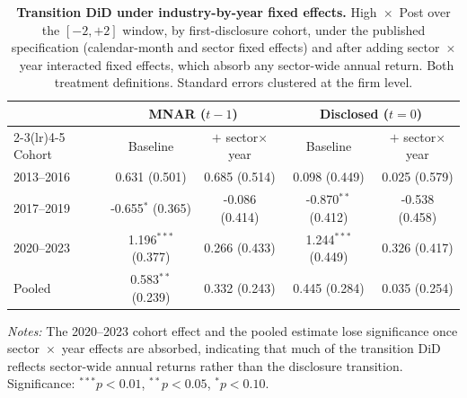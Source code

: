 \documentclass[a4paper,12pt]{article}
\begin{document}
\begin{table}[htbp]
\footnotesize\centering
\caption{\textbf{Transition DiD under industry-by-year fixed effects.}
High~$\times$~Post over the $[-2,+2]$ window, by first-disclosure cohort, under
the published specification (calendar-month and sector fixed effects) and after
adding sector~$\times$~year interacted fixed effects, which absorb any
sector-wide annual return. Both treatment definitions. Standard errors clustered
at the firm level.}
\label{tab:returns_did_industry_year}
\begin{tabular}{lcccc}
\toprule
 & \multicolumn{2}{c}{MNAR ($t-1$)} & \multicolumn{2}{c}{Disclosed ($t=0$)} \\
\cmidrule(lr){2-3}\cmidrule(lr){4-5}
Cohort & Baseline & $+$ sector$\times$year & Baseline & $+$ sector$\times$year \\
\midrule
2013--2016 & 0.631 (0.501) & 0.685 (0.514) & 0.098 (0.449) & 0.025 (0.579) \\
2017--2019 & -0.655$^{*}$ (0.365) & -0.086 (0.414) & -0.870$^{**}$ (0.412) & -0.538 (0.458) \\
2020--2023 & 1.196$^{***}$ (0.377) & 0.266 (0.433) & 1.244$^{***}$ (0.449) & 0.326 (0.417) \\
Pooled & 0.583$^{**}$ (0.239) & 0.332 (0.243) & 0.445 (0.284) & 0.035 (0.254) \\
\bottomrule
\end{tabular}
\begin{flushleft}\footnotesize
\textit{Notes:} The 2020--2023 cohort effect and the pooled estimate lose
significance once sector~$\times$~year effects are absorbed, indicating that much
of the transition DiD reflects sector-wide annual returns rather than the
disclosure transition. Significance: $^{***}p<0.01$, $^{**}p<0.05$, $^{*}p<0.10$.
\end{flushleft}
\end{table}
\end{document}
